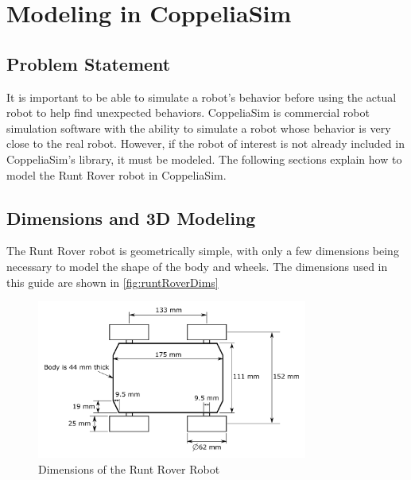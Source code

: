 \chapter{Modeling in CoppeliaSim}
\label{ch: Chapter1}

\section{Problem Statement}
It is important to be able to simulate a robot's behavior before using the actual robot to help find unexpected behaviors. CoppeliaSim is commercial robot simulation software with the ability to simulate a robot whose behavior is very close to the real robot. However, if the robot of interest is not already included in CoppeliaSim's library, it must be modeled. The following sections explain how to model the Runt Rover robot in CoppeliaSim.

\section{Dimensions and 3D Modeling}
The Runt Rover robot is geometrically simple, with only a few dimensions being necessary to model the shape of the body and wheels. The dimensions used in this guide are shown in \autoref{fig:runtRoverDims}

\begin{figure}
    \centering
    \includegraphics[width=3.5in]{figs/img/runtRoverDimensions}
    \caption{Dimensions of the Runt Rover Robot}
    \label{fig:runtRoverDims}
\end{figure}

